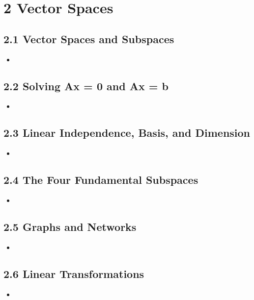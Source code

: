 \chapter{2 Vector Spaces}

\section{2.1 Vector Spaces and Subspaces}
\begin{itemize}
  \item []


\end{itemize}

\section{2.2 Solving Ax = 0 and Ax = b}
\begin{itemize}
  \item []


\end{itemize}

\section{2.3 Linear Independence, Basis, and Dimension}
\begin{itemize}
  \item []


\end{itemize}

\section{2.4 The Four Fundamental Subspaces}
\begin{itemize}
  \item []


\end{itemize}

\section{2.5 Graphs and Networks}
\begin{itemize}
  \item []


\end{itemize}

\section{2.6 Linear Transformations}
\begin{itemize}
  \item []


\end{itemize}
